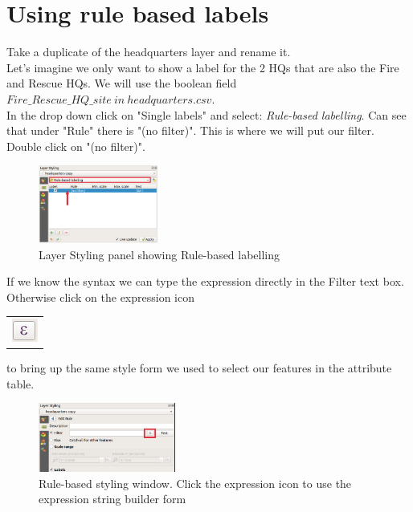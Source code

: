 \section{Using rule based labels}

Take a duplicate of the headquarters layer and rename it.\\

Let's imagine we only want to show a label for the 2 HQs that are also the Fire and Rescue HQs. We will use the boolean field $Fire\_Rescue\_HQ\_site\ in\ headquarters.csv$.\\

In the drop down click on "Single labels" and select: \textit{Rule-based labelling}. 
Can see that under "Rule" there is "(no filter)". This is where we will put our filter.  Double click on "(no filter)". 

\begin{figure}[!h]
	\centering
	\includegraphics[width=0.35\textwidth]{images/rule_based_labels.png}
	\caption{Layer Styling panel showing Rule-based labelling}
	\label{ft_fig_firstfig3}
\end{figure}


If we know the syntax we can type the expression directly in the Filter text box. Otherwise click on the expression icon 
\begin{tabular}{@{}c@{}}\includegraphics[width=4ex]{images/expression_icon.png}\end{tabular}
to bring up the same style form we used to select our features in the attribute table.

\begin{figure}[!h]
	\centering
	\includegraphics[width=0.4\textwidth]{images/rule_based_labels1a.png}
	\caption{Rule-based styling window. Click the expression icon to use the expression string builder form}
	\label{ft_fig_firstfig3}
\end{figure}

